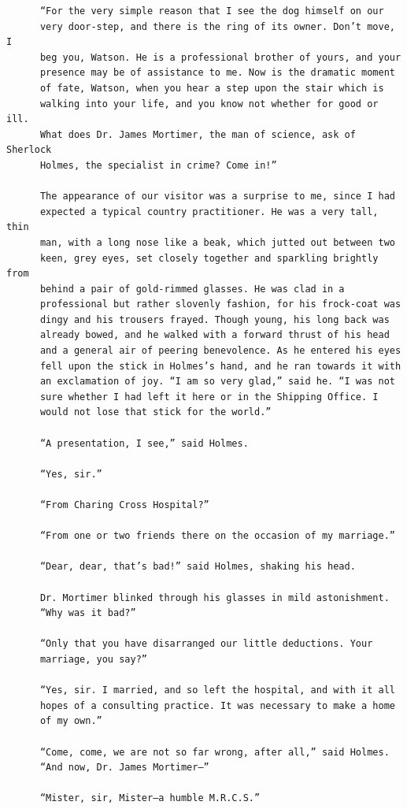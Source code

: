 \documentclass{article}
\begin{document}
\begin{verbatim}
      “For the very simple reason that I see the dog himself on our
      very door-step, and there is the ring of its owner. Don’t move, I
      beg you, Watson. He is a professional brother of yours, and your
      presence may be of assistance to me. Now is the dramatic moment
      of fate, Watson, when you hear a step upon the stair which is
      walking into your life, and you know not whether for good or ill.
      What does Dr. James Mortimer, the man of science, ask of Sherlock
      Holmes, the specialist in crime? Come in!”

      The appearance of our visitor was a surprise to me, since I had
      expected a typical country practitioner. He was a very tall, thin
      man, with a long nose like a beak, which jutted out between two
      keen, grey eyes, set closely together and sparkling brightly from
      behind a pair of gold-rimmed glasses. He was clad in a
      professional but rather slovenly fashion, for his frock-coat was
      dingy and his trousers frayed. Though young, his long back was
      already bowed, and he walked with a forward thrust of his head
      and a general air of peering benevolence. As he entered his eyes
      fell upon the stick in Holmes’s hand, and he ran towards it with
      an exclamation of joy. “I am so very glad,” said he. “I was not
      sure whether I had left it here or in the Shipping Office. I
      would not lose that stick for the world.”

      “A presentation, I see,” said Holmes.

      “Yes, sir.”

      “From Charing Cross Hospital?”

      “From one or two friends there on the occasion of my marriage.”

      “Dear, dear, that’s bad!” said Holmes, shaking his head.

      Dr. Mortimer blinked through his glasses in mild astonishment.
      “Why was it bad?”

      “Only that you have disarranged our little deductions. Your
      marriage, you say?”

      “Yes, sir. I married, and so left the hospital, and with it all
      hopes of a consulting practice. It was necessary to make a home
      of my own.”

      “Come, come, we are not so far wrong, after all,” said Holmes.
      “And now, Dr. James Mortimer—”

      “Mister, sir, Mister—a humble M.R.C.S.”


\end{verbatim}
\end{document}
